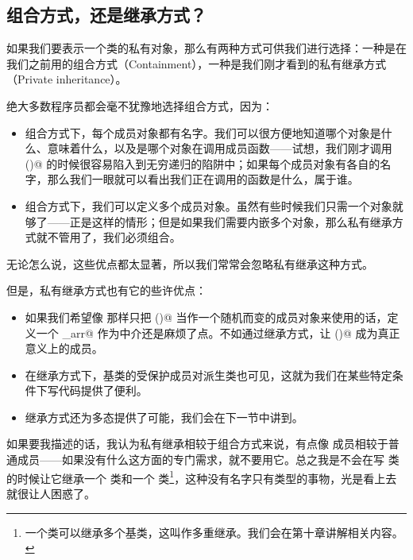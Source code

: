 \subsection*{组合方式，还是继承方式？}
如果我们要表示一个类的私有对象，那么有两种方式可供我们进行选择：一种是在我们之前用的组合方式（Containment），一种是我们刚才看到的私有继承方式（Private inheritance）。\par
绝大多数程序员都会毫不犹豫地选择组合方式，因为：
\begin{itemize}
    \item 组合方式下，每个成员对象都有名字。我们可以很方便地知道哪个对象是什么、意味着什么，以及是哪个对象在调用成员函数——试想，我们刚才调用 \lstinline@size()@ 的时候很容易陷入到无穷递归的陷阱中；如果每个成员对象有各自的名字，那么我们一眼就可以看出我们正在调用的函数是什么，属于谁。
    \item 组合方式下，我们可以定义多个成员对象。虽然有些时候我们只需一个对象就够了——\lstinline@stack@ 正是这样的情形；但是如果我们需要内嵌多个对象，那么私有继承方式就不管用了，我们必须组合。
\end{itemize}
无论怎么说，这些优点都太显著，所以我们常常会忽略私有继承这种方式。\par
但是，私有继承方式也有它的些许优点：
\begin{itemize}
    \item 如果我们希望像 \lstinline@Arr@ 那样只把 \lstinline@p()@ 当作一个随机而变的成员对象来使用的话，定义一个 \lstinline@_arr@ 作为中介还是麻烦了点。不如通过继承方式，让 \lstinline@p()@ 成为真正意义上的成员。
    \item 在继承方式下，基类的受保护成员对派生类也可见，这就为我们在某些特定条件下写代码提供了便利。
    \item 继承方式还为多态提供了可能，我们会在下一节中讲到。
\end{itemize}\par
如果要我描述的话，我认为私有继承相较于组合方式来说，有点像 \lstinline@mutable@ 成员相较于普通成员——如果没有什么这方面的专门需求，就不要用它。总之我是不会在写 \lstinline@Dog@ 类的时候让它继承一个 \lstinline@unsigned@ 类和一个 \lstinline@double@ 类\footnote{一个类可以继承多个基类，这叫作多重继承。我们会在第十章讲解相关内容。}，这种没有名字只有类型的事物，光是看上去就很让人困惑了。\par
